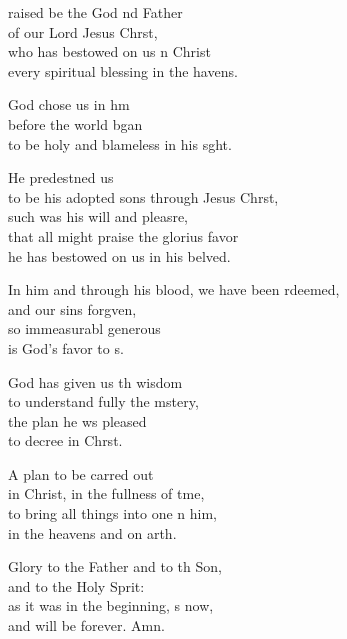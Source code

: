 \settowidth{\versewidth}{In him and through his blood, we have been redeemed, *}
\begin{psalmverse}%
  \begin{patverse}
raised be the God nd Father\Med\\
of our Lord Jesus Chr\pointup{\i}st,\\
who has bestowed on us \pointup{\i}n Christ\Med\\
every spiritual blessing in the havens.

God chose us in h\pointup{\i}m\Flex\\
before the world bgan\Med\\
to be holy and blameless in his s\pointup{\i}ght.

He predest\pointup{\i}ned us\Med\\
to be his adopted sons through Jesus Chr\pointup{\i}st,\\
such was his will and pleasre,\Flex\\
that all might praise the glorius favor\Med\\
he has bestowed on us in his belved.

In him and through his blood, we have been rdeemed,\Med\\
and our sins forg\pointup{\i}ven,\\
so immeasurabl generous\Med\\
is God’s favor to s.

God has given us th wisdom\Med\\
to understand fully the mstery,\\
the plan he ws pleased\Med\\
to decree in Chr\pointup{\i}st.

A plan to be carr\pointup{\i}ed out\Med\\
in Christ, in the fullness of t\pointup{\i}me,\\
to bring all things into one \pointup{\i}n him,\Med\\
in the heavens and on arth.

Glory to the Father and to th Son,\Med\\
and to the Holy Sp\pointup{\i}rit:\\
as it was in the beginning, \pointup{\i}s now,\Med\\
and will be forever. Amn.
  \end{patverse}
\end{psalmverse}
